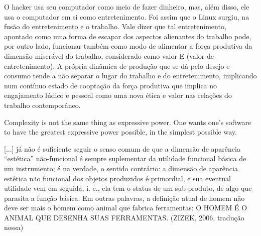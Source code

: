 \begin{citacao}
O hacker usa seu computador como meio de fazer dinheiro, mas, além disso, ele usa o computador em si como entretenimento. Foi assim que o Linux surgiu, na fusão do entretenimento e o trabalho.
Vale dizer que tal entretenimento, apontado como uma forma de escapar dos aspectos alienantes do trabalho pode, por outro lado, funcionar também como modo de alimentar a força produtiva da dimensão miserável do trabalho, considerado como valor E (valor de entretenimento). A própria dinâmica de produção que se dá pelo desejo e consumo tende a não separar o lugar do trabalho e do entretenimento, implicando num contínuo estado de cooptação da força produtiva que implica no engajamento lúdico e pessoal como uma nova ética e valor nas relações do trabalho contemporâneo. \cite[24]{Obici2014}
\end{citacao}




Complexity is not the same thing as expressive power. One wants one’s software to have the greatest expressive power possible, in the simplest possible way. \cite{PucketteMiller}


[...] já não é suficiente seguir o senso comum de que a dimensão de aparência ``estética'' não-funcional é sempre suplementar da utilidade funcional básica de um instrumento; é na verdade, o sentido contrário: a dimensão de aparência estética não funcional dos objetos produzidos é primordial, e sua eventual utilidade vem em seguida, i. e., ela tem o status de um sub-produto, de algo que parasita a função básica. Em outras palavras, a definição atual de homem não deve ser mais o homem como animal que fabrica ferramentas: O HOMEM É O ANIMAL QUE DESENHA SUAS FERRAMENTAS. (ZIZEK, 2006, tradução nossa)


